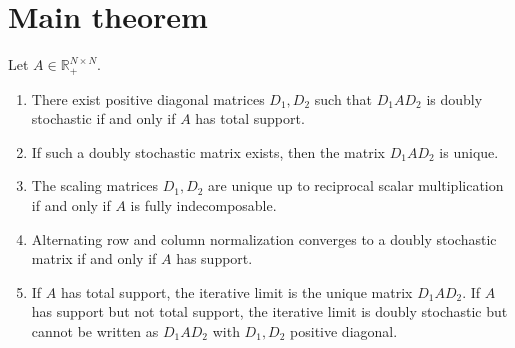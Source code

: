 \section{Main theorem}
\begin{theorem}
Let \(A\in\mathbb{R}_+^{N\times N}\).
\begin{enumerate}[leftmargin=2em]
\item There exist positive diagonal matrices \(D_1,D_2\) such that \(D_1AD_2\) is doubly stochastic if and only if \(A\) has total support.
\item If such a doubly stochastic matrix exists, then the matrix \(D_1AD_2\) is unique.
\item The scaling matrices \(D_1,D_2\) are unique up to reciprocal scalar multiplication if and only if \(A\) is fully indecomposable.
\item Alternating row and column normalization converges to a doubly stochastic matrix if and only if \(A\) has support.
\item If \(A\) has total support, the iterative limit is the unique matrix \(D_1AD_2\).  If \(A\) has support but not total support, the iterative limit is doubly stochastic but cannot be written as \(D_1AD_2\) with \(D_1,D_2\) positive diagonal.
\end{enumerate}
\end{theorem}

